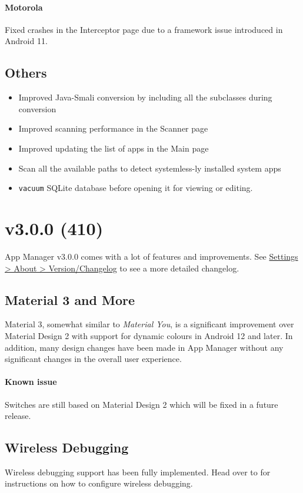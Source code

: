 \paragraph{Motorola} Fixed crashes in the Interceptor page due to a framework issue introduced in Android 11.

\subsection{Others}
\begin{itemize}
    \item Improved Java-Smali conversion by including all the subclasses during conversion
    \item Improved scanning performance in the Scanner page
    \item Improved updating the list of apps in the Main page
    \item Scan all the available paths to detect systemless-ly installed system apps
    \item \texttt{vacuum} SQLite database before opening it for viewing or editing.
\end{itemize}

\section{v3.0.0 (410)}\label{sec:v3.0.0-(410)}

App Manager v3.0.0 comes with a lot of features and improvements.
See \href{app-manager://settings/about/version}{Settings > About > Version/Changelog} to see a more detailed changelog.

\subsection{Material 3 and More}
Material 3, somewhat similar to \textit{Material You}, is a significant improvement over Material Design 2 with support for dynamic colours in Android 12 and later.
In addition, many design changes have been made in App Manager without any significant changes in the overall user experience.

\paragraph{Known issue} Switches are still based on Material Design 2 which will be fixed in a future release.

\subsection{Wireless Debugging}
Wireless debugging support has been fully implemented. Head over to  for instructions on how to configure wireless debugging.

